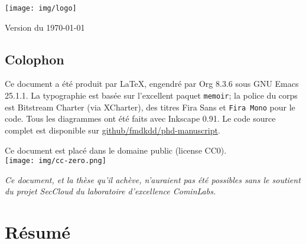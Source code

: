 \vspace{3cm}
\begin{flushright}
{\large\theauthor}
\end{flushright}

\vfill
\begin{center}
\texttt{[image: img/logo]}
\end{center}

\vfill
\begin{center}
Version \versiontag{} du \today
\end{center}


\cleartoverso
\phantom{a}                     %
\vfill
\begin{minipage}{26pc}
\subsection*{Colophon}
Ce document a été produit par \LaTeX{}, engendré par Org 8.3.6 sous GNU Emacs
25.1.1.  La typographie est basée sur l'excellent paquet \texttt{memoir}; la
police du corps est Bitstream Charter (via XCharter), des titres \textsf{Fira
Sans} et \texttt{Fira Mono} pour le code.  Tous les diagrammes ont été faits
avec Inkscape 0.91.  Le code source complet est disponible sur
\href{https://github.com/fmdkdd/phd-manuscript}{github/fmdkdd/phd-manuscript}.

\vfill
\begin{center}
Ce document est placé dans le domaine public (license CC0).\\
\vspace{4pt}
\texttt{[image: img/cc-zero.png]}
\end{center}
\end{minipage}

\cleartorecto
\begin{minipage}{26pc}
\itshape Ce document, et la thèse qu'il achève, n'auraient pas été possibles
sans le soutient du projet SecCloud du laboratoire d'excellence CominLabs.
\end{minipage}
\vfill
\begin{minipage}{26pc}
\section*{Résumé}

\end{minipage}
\vfill
\phantom{a}

